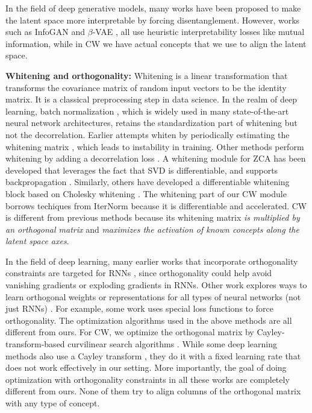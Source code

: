 \documentclass{article}
\begin{document}
In the field of deep generative models, many works have been proposed to make the latent space more interpretable by forcing disentanglement. However, works such as InfoGAN \cite{chen2016infogan} and $\beta$-VAE \cite{higgins2017beta}, all use heuristic interpretability losses like mutual information, while in CW we have actual concepts that we use to align the latent space.

\textbf{Whitening and orthogonality:}
Whitening is a linear transformation that transforms the covariance matrix of random input vectors to be the identity matrix. It is a classical preprocessing step in data science. In the realm of deep learning, batch normalization \cite{ioffe2015batch}, which is widely used in many state-of-the-art neural network architectures, retains the standardization part of whitening but not the decorrelation. Earlier attempts whiten by periodically estimating the whitening matrix \cite{desjardins2015natural,luo2017learning}, which leads to instability in training. Other methods perform whitening by adding a decorrelation loss \cite{cogswell2015reducing}. 
A whitening module for ZCA has been developed that leverages the fact that SVD is differentiable, and supports backpropagation  \cite{huang2018decorrelated, huang2019iterative}.
Similarly, others have developed a differentiable whitening block based on Cholesky whitening \cite{siarohin2018whitening}. The whitening part of our CW module borrows techiques from IterNorm \cite{huang2019iterative} because it is differentiable and accelerated. CW is different from previous methods because its whitening matrix \textit{is multiplied by an orthogonal matrix} and \textit{maximizes the activation of known concepts along the latent space axes}.

In the field of deep learning, many earlier works that incorporate orthogonality constraints are targeted for RNNs \cite{vorontsov2017orthogonality,mhammedi2017efficient,wisdom2016full}, since orthogonality could help avoid vanishing gradients or exploding gradients in RNNs. Other work explores ways to learn orthogonal weights or representations for all types of neural networks (not just RNNs) \cite{harandi2016generalized, huang2018orthogonal,lezcano2019cheap,lezama2018ole}. For example, some work \cite{lezama2018ole} uses special loss functions to force orthogonality. The optimization algorithms used in the above methods are all different from ours. For CW, we optimize the orthogonal matrix by Cayley-transform-based curvilinear search algorithms \cite{wen2013feasible}. While some deep learning methods also use a Cayley transform \cite{vorontsov2017orthogonality}, they do it with a fixed learning rate that does not work effectively in our setting. More importantly, the goal of doing optimization with orthogonality constraints in all these works are completely different from ours. None of them try to align columns of the orthogonal matrix with any type of concept.
\end{document}
